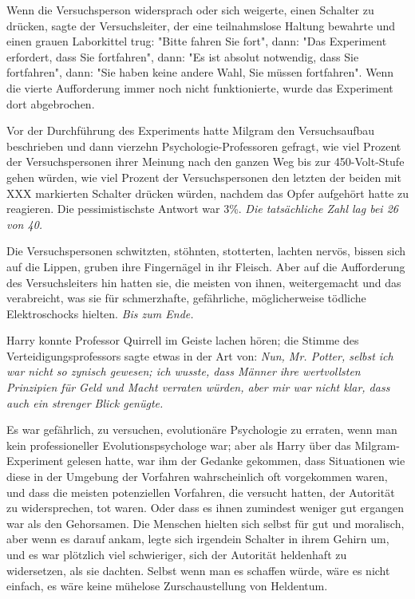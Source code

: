 {Wenn die Versuchsperson widersprach oder sich weigerte, einen Schalter zu drücken, sagte der Versuchsleiter, der eine teilnahmslose Haltung bewahrte und einen grauen Laborkittel trug: "Bitte fahren Sie fort", dann: "Das Experiment erfordert, dass Sie fortfahren", dann: "Es ist absolut notwendig, dass Sie fortfahren", dann: "Sie haben keine andere Wahl, Sie müssen fortfahren". Wenn die vierte Aufforderung immer noch nicht funktionierte, wurde das Experiment dort abgebrochen.

Vor der Durchführung des Experiments hatte Milgram den Versuchsaufbau beschrieben und dann vierzehn Psychologie-Professoren gefragt, wie viel Prozent der Versuchspersonen ihrer Meinung nach den ganzen Weg bis zur 450-Volt-Stufe gehen würden, wie viel Prozent der Versuchspersonen den letzten der beiden mit XXX markierten Schalter drücken würden, nachdem das Opfer aufgehört hatte zu reagieren. Die pessimistischste Antwort war 3\%. \emph{Die tatsächliche Zahl lag bei 26 von 40.}

Die Versuchspersonen schwitzten, stöhnten, stotterten, lachten nervös, bissen sich auf die Lippen, gruben ihre Fingernägel in ihr Fleisch. Aber auf die Aufforderung des Versuchsleiters hin hatten sie, die meisten von ihnen, weitergemacht und das verabreicht, was sie für schmerzhafte, gefährliche, möglicherweise tödliche Elektroschocks hielten. \emph{Bis zum Ende.}

Harry konnte Professor Quirrell im Geiste lachen hören; die Stimme des Verteidigungsprofessors sagte etwas in der Art von: \emph{Nun, Mr. Potter, selbst ich war nicht so zynisch gewesen; ich wusste, dass Männer ihre wertvollsten Prinzipien für Geld und Macht verraten würden, aber mir war nicht klar, dass auch ein strenger Blick genügte.}

Es war gefährlich, zu versuchen, evolutionäre Psychologie zu erraten, wenn man kein professioneller Evolutionspsychologe war; aber als Harry über das Milgram-Experiment gelesen hatte, war ihm der Gedanke gekommen, dass Situationen wie diese in der Umgebung der Vorfahren wahrscheinlich oft vorgekommen waren, und dass die meisten potenziellen Vorfahren, die versucht hatten, der Autorität zu widersprechen, tot waren. Oder dass es ihnen zumindest weniger gut ergangen war als den Gehorsamen. Die Menschen hielten sich selbst für gut und moralisch, aber wenn es darauf ankam, legte sich irgendein Schalter in ihrem Gehirn um, und es war plötzlich viel schwieriger, sich der Autorität heldenhaft zu widersetzen, als sie dachten. Selbst wenn man es schaffen würde, wäre es nicht einfach, es wäre keine mühelose Zurschaustellung von Heldentum.

}
